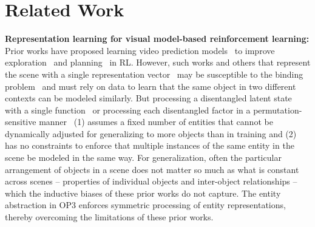 \section{Related Work} \label{sec:related_work}
\textbf{Representation learning for visual model-based reinforcement learning:}
Prior works have proposed learning video prediction models~\citep{wichers2018hierarchical,denton2017unsupervised,lee2018stochastic,finn2016unsupervised} to improve exploration~\citep{oh2015action} and planning~\citep{finn2017deep} in RL.
However, such works and others that represent the scene with a single representation vector~\citep{hafner2018learning,zhang2018solar,mnih-dqn-2015,oh2016control} may be susceptible to the binding problem~\citep{greff2015binding,rosenblatt1961principles} and must rely on data to learn that the same object in two different contexts can be modeled similarly.
But processing a disentangled latent state with a single function~\citep{whitney2016understanding,chen2016infogan,kulkarni2015deep,kulkarni2019unsupervised,goel2018unsupervised} or processing each disentangled factor in a permutation-sensitive manner~\citep{lee2018stochastic,xu2019unsupervised,kulkarni2019unsupervised} (1) assumes a fixed number of entities that cannot be dynamically adjusted for generalizing to more objects than in training and (2) has no constraints to enforce that multiple instances of the same entity in the scene be modeled in the same way.
For generalization, often the particular arrangement of objects in a scene does not matter so much as what is constant across scenes -- properties of individual objects and inter-object relationships -- which the inductive biases of these prior works do not capture.
The entity abstraction in OP3 enforces symmetric processing of entity representations, thereby overcoming the limitations of these prior works.

